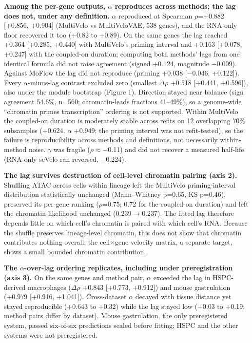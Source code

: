 \documentclass[10pt,twocolumn]{article}
\begin{document}
\textbf{Among the per-gene outputs, $\alpha$ reproduces across methods; the lag does not, under any definition.} $\alpha$ reproduced at Spearman $\rho$=+0.882 [+0.856, +0.904] (MultiVelo vs MultiVeloVAE, 538 genes), and the RNA-only floor recovered it too (+0.82 to +0.89). On the same genes the lag reached +0.364 [+0.285, +0.440] with MultiVelo's priming interval and +0.163 [+0.078, +0.247] with the coupled-on duration; computing both methods' lags from one identical formula did not raise agreement (signed +0.124, magnitude $-$0.009). Against MoFlow the lag did not reproduce (priming +0.038 [$-$0.046, +0.122]). Every $\alpha$-minus-lag contrast excluded zero (smallest $\Delta$$\rho$ +0.518 [+0.441, +0.596]), also under the module bootstrap (Figure 1). Direction stayed near balance (sign agreement 54.6\%, n=560; chromatin-leads fractions 41--49\%), so a genome-wide ``chromatin primes transcription'' ordering is not supported. Within MultiVelo the coupled-on duration is moderately stable across refits on 12 overlapping 70\% subsamples (+0.624, $\alpha$ +0.949; the priming interval was not refit-tested), so the failure is reproducibility across methods and definitions, not necessarily within-method noise. $\gamma$ was fragile ($\rho$$\approx$$-$0.11) and did not recover a measured half-life (RNA-only scVelo ran reversed, $-$0.224).

\textbf{The lag survives destruction of cell-level chromatin pairing (axis 2).} Shuffling ATAC across cells within lineage left the MultiVelo priming-interval distribution statistically unchanged (Mann--Whitney p=0.65, KS p=0.46), preserved its per-gene ranking ($\rho$=0.75; 0.72 for the coupled-on duration) and left the chromatin likelihood unchanged (0.239$\rightarrow$0.237). The fitted lag therefore depends little on which cell's chromatin is paired with which cell's RNA. Because the shuffle preserves lineage-level chromatin, this does not show that chromatin contributes nothing overall; the cell$\times$gene velocity matrix, a separate target, shows a small bounded chromatin contribution.

\textbf{The $\alpha$-over-lag ordering replicates, including under preregistration (axis 3).} On the same genes and method pair, $\alpha$ exceeded the lag in HSPC-derived macrophages ($\Delta$$\rho$ +0.843 [+0.773, +0.912]) and mouse gastrulation (+0.979 [+0.916, +1.041]). Cross-dataset $\alpha$ decayed with tissue distance yet stayed reproducible (+0.643 to +0.32) while the lag stayed low (+0.03 to +0.19; method pairs differ by dataset). Mouse gastrulation, the only preregistered system, passed six-of-six predictions sealed before fitting; HSPC and the other systems were not preregistered.
\end{document}
